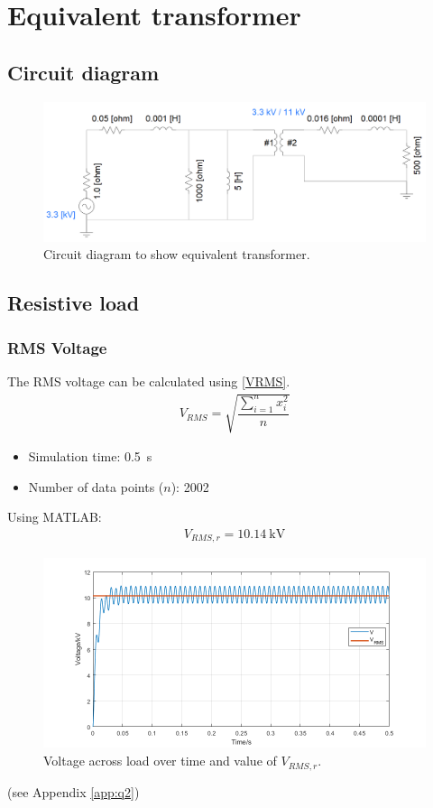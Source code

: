 \section{Equivalent transformer}
\subsection{Circuit diagram}
\begin{figure}[H]
    \centering
    \includegraphics[width = \textwidth]{img/figure5.png}
    \caption{Circuit diagram to show equivalent transformer.}
    \label{fig:transformerCircuit}
\end{figure}
\subsection{Resistive load}
\subsubsection{RMS Voltage }
The RMS voltage can be calculated using \eqref{VRMS}.
\begin{gather}\label{VRMS}
    V_{RMS} = \sqrt{\dfrac{\sum_{i=1}^n x_i^2}{n}}
\end{gather}
\begin{itemize}
    \item Simulation time: \SI{0.5}{\second}
    \item Number of data points ($n$): 2002
\end{itemize}
Using MATLAB:
\begin{gather}
    V_{RMS,r} = \SI{10.14}{\kilo\volt}
\end{gather}
\begin{figure}[H]
    \centering
    \includegraphics[width = \textwidth]{img/figure8.png}
    \caption{Voltage across load over time and value of $V_{RMS,r}$.}
    \label{fig:VRMSResistor}
\end{figure}
(see Appendix \ref{app:q2})
